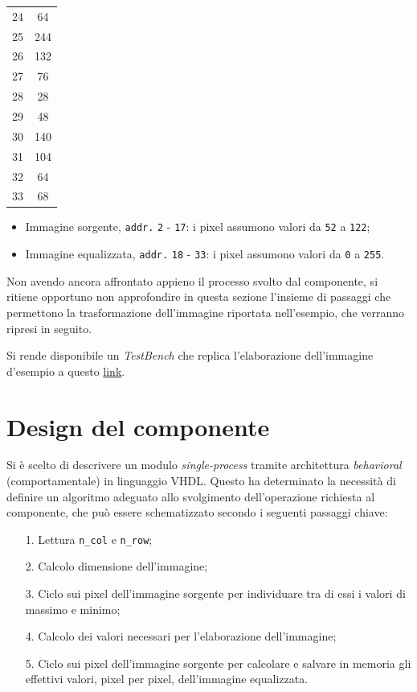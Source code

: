 \documentclass{article}
\begin{document}
\begin{table}[h]
\begin{tabular}{c|c}
        24    & 64   \\
        25    & 244  \\
        26    & 132  \\
        27    & 76   \\
        28    & 28   \\
        29    & 48   \\
        30    & 140  \\
        31    & 104  \\
        32    & 64   \\
        33    & 68   \\
    \end{tabular}
\end{table}

\begin{itemize}
    \item Immagine sorgente, \texttt{addr.} \texttt{2} - \texttt{17}: i pixel assumono valori da \texttt{52} a \texttt{122};
    \item Immagine equalizzata, \texttt{addr.} \texttt{18} - \texttt{33}: i pixel assumono valori da \texttt{0} a \texttt{255}.
\end{itemize}

Non avendo ancora affrontato appieno il processo svolto dal componente, si ritiene opportuno non approfondire in questa sezione
l'insieme di passaggi che permettono la trasformazione dell'immagine riportata nell'esempio, che verranno ripresi in seguito. \par
Si rende disponibile un \emph{TestBench} che replica l'elaborazione dell'immagine d'esempio a questo \href{https://polimi365-my.sharepoint.com/:f:/g/personal/10628782_polimi_it/EgwOb4V2Oj5Cnx3qEVuZ200BZdZsEs7zgI2Tc3eQFnCPpg?e=h7xHbB}{link}.

\pagebreak

\section{Design del componente} %
Si è scelto di descrivere un modulo \emph{single-process} tramite architettura \emph{behavioral} (comportamentale) in linguaggio VHDL.
Questo ha determinato la necessità di definire un algoritmo adeguato allo svolgimento dell’operazione richiesta al componente, che può essere schematizzato secondo i seguenti passaggi chiave:
\begin{itemize}
    \item   [1.]    Lettura \texttt{n\_col} e \texttt{n\_row};
    \item   [2.]    Calcolo dimensione dell'immagine;
    \item   [3.]    Ciclo sui pixel dell’immagine sorgente per individuare tra di essi i valori di massimo e minimo;
    \item   [4.]    Calcolo dei valori necessari per l’elaborazione dell’immagine;
    \item   [5.]    Ciclo sui pixel dell’immagine sorgente per calcolare e salvare in memoria gli effettivi valori, pixel per pixel, dell’immagine equalizzata.
\end{itemize}
\end{document}
